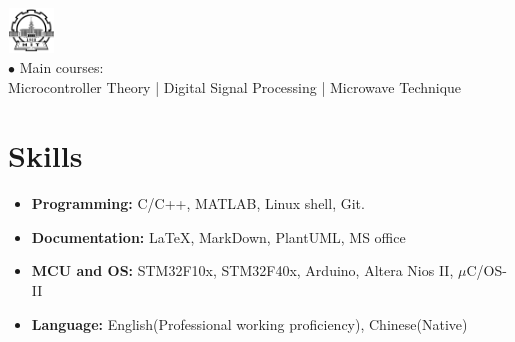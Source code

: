 \documentclass[12pt,a4paper,sans]{moderncv}        %
\begin{document}
\includegraphics[width=1.25cm,height=1.2cm]{hit.jpg} \vspace{-25pt}\\
\hspace*{1.3cm}
{
\hspace*{1cm} $\bullet$ Main courses: \\
\hspace*{1.3cm} Microcontroller Theory | Digital Signal Processing | Microwave Technique 
}  %







\section{Skills}

\vspace{3pt}

\begin{itemize}

\item \textbf{Programming:} C/C++, MATLAB, Linux shell, Git.

\vspace{6pt}

\item \textbf{Documentation:} \LaTeX , MarkDown, PlantUML, MS office

\vspace{6pt}

\item \textbf{MCU and OS:}  STM32F10x, STM32F40x, Arduino, Altera Nios II, $\mu$C/OS-II

\vspace{6pt}

\item \textbf{Language:} English(Professional working proficiency), Chinese(Native)

\vspace{6pt}

\end{itemize}
\end{document}
